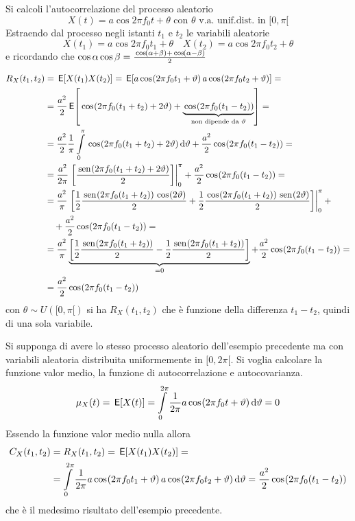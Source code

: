 \begin{esempio}\label{es:oscillatore_non_stazionario}
Si calcoli l'autocorrelazione del processo aleatorio\[X(t)=a\cos{2\pi f_0 t+\theta}\text{ con }\theta\text{ v.a. unif.dist. in }[0,\pi[\]
Estraendo dal processo negli istanti $t_1$ e $t_2$ le variabili aleatorie 
\[X(t_1)=a\cos{2\pi f_0 t_1+\theta}\quad X(t_2)=a\cos{2\pi f_0 t_2+\theta}\]
e ricordando che $\operatorname{cos}\alpha\operatorname{cos}\beta=\frac{\,{\operatorname{cos}}^{}\!\left({\alpha+\beta}\right)+\,{\operatorname{cos}}^{}\!\left({\alpha-\beta}\right)}{2}$

\begin{equation}\label{eq:autocorrelazione_oscillatore_non_stazionario}
\begin{split}R_X(t_1,t_2)&=\E{X(t_1)X(t_2)}=\E{a\cos{2\pi f_0 t_1+\theta}a\cos{2\pi f_0 t_2+\theta}}=\\
&=\frac{a^2}{2}\E{\cos{2\pi f_0(t_1+t_2)+2\theta}+\underbrace{\cos{2\pi f_0(t_1-t_2)}}_{\text{non dipende da $\theta$}}}=\\
&=\frac{a^2}{2}\frac{1}{\pi}\intd{0}{\pi}{\cos{2\pi f_0(t_1+t_2)+2\theta}}{\theta}+\frac{a^2}{2}\cos{2\pi f_0(t_1-t_2)}=\\
&=\frac{a^2}{2\pi}\bound{0}{\pi}{\frac{\sen{2\pi f_0(t_1+t_2)+2\theta}}{2}}+\frac{a^2}{2}\cos{2\pi f_0(t_1-t_2)}=\\
&=\frac{a^2}{\pi}\bound{0}{\pi}{\frac{1}{2}\frac{\sen{2\pi f_0(t_1+t_2)}\cos{2\theta}}{2}+\frac{1}{2}\frac{\cos{2\pi f_0(t_1+t_2)}\sen{2\theta}}{2}}+\\
&\quad+\frac{a^2}{2}\cos{2\pi f_0(t_1-t_2)}=\\
&=\frac{a^2}{\pi}\underbrace{\left[\frac{1}{2}\frac{\sen{2\pi f_0(t_1+t_2)}}{2}-\frac{1}{2}\frac{\sen{2\pi f_0(t_1+t_2)}}{2}\right]}_{=0}+\frac{a^2}{2}\cos{2\pi f_0(t_1-t_2)}=\\
&=\frac{a^2}{2}\cos{2\pi f_0(t_1-t_2)}
\end{split}\end{equation}
con $\theta\sim U([0,\pi[)$ si ha $R_X(t_1,t_2)$ che è funzione della differenza $t_1-t_2$, quindi di una sola variabile.
\end{esempio}
\begin{esempio}\label{es:oscillatore_stazionario}
Si supponga di avere lo stesso processo aleatorio dell'esempio precedente ma con variabili aleatoria distribuita uniformemente in $[0,2\pi[$. Si voglia calcolare la funzione valor medio, la funzione di autocorrelazione e autocovarianza.
\[\mu_X(t)=\,{\operatorname{\mathsf{E}}}\!\left[{X(t)}\right]=\int\limits_{0}^{2\pi}{\frac{1}{2\pi}a\,{\operatorname{cos}}^{}\!\left({2\pi f_0 t+\vartheta}\right)}{\,\mathop{}\!\mathrm{d}{\vartheta}}=0\]
Essendo la funzione valor medio nulla allora
\begin{equation}\label{eq:autocorrelazione_oscillatore_stazionario}
\begin{split}C_X(t_1,t_2)&=R_X(t_1,t_2)=\,{\operatorname{\mathsf{E}}}\!\left[{X(t_1)X(t_2)}\right]=\\&=\int\limits_{0}^{2\pi}{\frac{1}{2\pi}a\,{\operatorname{cos}}^{}\!\left({2\pi f_0 t_1+\vartheta}\right)a\,{\operatorname{cos}}^{}\!\left({2\pi f_0 t_2+\vartheta}\right)}{\,\mathop{}\!\mathrm{d}{\vartheta}}=\frac{a^2}{2}\,{\operatorname{cos}}^{}\!\left({2\pi f_0(t_1-t_2)}\right)\end{split}\end{equation}
che è il medesimo risultato dell'esempio precedente.
\end{esempio}


